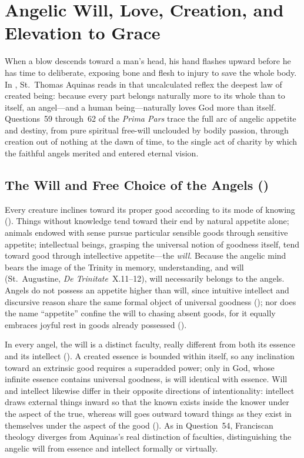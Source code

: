 \section{Angelic Will, Love, Creation, and Elevation to Grace}\label{sec:st-will-grace}

When a blow descends toward a man's head, his hand flashes upward before he has time to deliberate, exposing bone and flesh to injury to save the whole body. In , St.~Thomas Aquinas reads in that uncalculated reflex the deepest law of created being: because every part belongs naturally more to its whole than to itself, an angel---and a human being---naturally loves God more than itself. Questions~59 through~62 of the \emph{Prima Pars} trace the full arc of angelic appetite and destiny, from pure spiritual free-will unclouded by bodily passion, through creation out of nothing at the dawn of time, to the single act of charity by which the faithful angels merited and entered eternal vision.

\subsection{The Will and Free Choice of the Angels ()}

Every creature inclines toward its proper good according to its mode of knowing (). Things without knowledge tend toward their end by natural appetite alone; animals endowed with sense pursue particular sensible goods through sensitive appetite; intellectual beings, grasping the universal notion of goodness itself, tend toward good through intellective appetite---the \emph{will}. Because the angelic mind bears the image of the Trinity in memory, understanding, and will (St.~Augustine, \emph{De Trinitate}~X.11--12), will necessarily belongs to the angels. Angels do not possess an appetite higher than will, since intuitive intellect and discursive reason share the same formal object of universal goodness (); nor does the name ``appetite'' confine the will to chasing absent goods, for it equally embraces joyful rest in goods already possessed ().

In every angel, the will is a distinct faculty, really different from both its essence and its intellect (). A created essence is bounded within itself, so any inclination toward an extrinsic good requires a superadded power; only in God, whose infinite essence contains universal goodness, is will identical with essence. Will and intellect likewise differ in their opposite directions of intentionality: intellect draws external things inward so that the known exists inside the knower under the aspect of the true, whereas will goes outward toward things as they exist in themselves under the aspect of the good (). As in Question~54, Franciscan theology diverges from Aquinas's real distinction of faculties, distinguishing the angelic will from essence and intellect formally or virtually.

